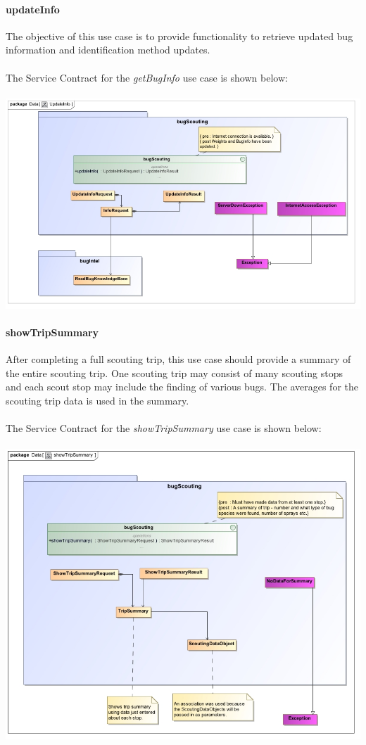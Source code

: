 \documentclass[11pt,a4paper,titlepage]{article}
\begin{document}
		\paragraph{updateInfo }
		The objective of this use case is to provide functionality to retrieve updated bug information and identification method updates.\\\hfill\\
		The Service Contract for the \textit{getBugInfo} use case is shown below:\\\hfill\\
		\includegraphics[width=\linewidth]{updateInfo}
		
		\paragraph{showTripSummary }
		After completing a full scouting trip, this use case should provide a summary of the entire scouting trip. One scouting trip may consist of many scouting stops and each scout stop may include the finding of various bugs. The averages for the scouting trip data is used in the summary.\\\hfill\\
		The Service Contract for the \textit{showTripSummary} use case is shown below:\\\hfill\\
		\includegraphics[width=\linewidth]{showTripSummary}
		
\end{document}
